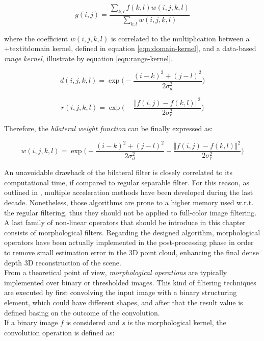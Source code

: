 \begin{equation}
	\label{eqn:bilateral-filter}
	g(i, j) = \frac{\sum_{k,l} f(k,l)w(i,j,k,l)}{\sum_{k,l}w(i,j,k,l)}
\end{equation}

where the coefficient $w(i,j,k,l)$ is correlated to the multiplication between a +textit{domain kernel}, defined in equation \ref{eqn:domain-kernel}, and a data-based \textit{range kernel}, illustrate by equation \ref{eqn:range-kernel}.

\begin{equation}
	\label{eqn:domain-kernel}
	d(i,j,k,l) = \exp \Big( - \frac{(i - k)^2 + (j - l)^2}{2 \sigma^2_d} \Big)
\end{equation}

\begin{equation}
	\label{eqn:range-kernel}
	r(i,j,k,l) = \exp \Big( - \frac{\Vert f(i,j) - f(k,l) \Vert^2}{2 \sigma^2_r} \Big)
\end{equation}

Therefore, the \textit{bilateral weight function} can be finally expressed as:

\begin{equation}
	\label{eqn:bilateral-weight-fnct}
	w(i,j,k,l) = \exp \Big( - \frac{(i - k)^2 + (j - l)^2}{2 \sigma^2_d}  - \frac{\Vert f(i,j) - f(k,l) \Vert^2}{2 \sigma^2_r}\Big)
\end{equation}

An unavoidable drawback of the bilateral filter is closely correlated to its computational time, if compared to regular separable filter.
For this reason, as outlined in \cite{Szeliski2011}, multiple acceleration methods have been developed during the last decade.
Nonetheless, those algorithms are prone to a higher memory used w.r.t. the regular filtering, thus they should not be applied to full-color image filtering.\\
A last family of non-linear operators that should be introduce in this chapter consists of morphological filters.
Regarding the designed algorithm, morphological operators have been actually implemented in the post-processing phase in order to remove small estimation error in the 3D point cloud, enhancing the final dense depth 3D reconstruction of the scene.\\
From a theoretical point of view, \textit{morphological operations} are typically implemented over binary or thresholded images. 
This kind of filtering techniques are executed by first convolving the input image with a binary structuring element, which could have different shapes, and after that the result value is defined basing on the outcome of the convolution.\\
If a binary image $f$ is considered and $s$ is the morphological kernel, the convolution operation is defined as:


